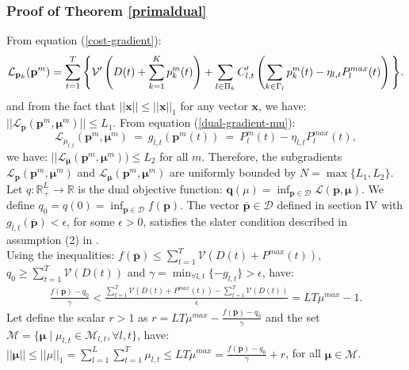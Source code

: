 \documentclass[12pt,draftcls,onecolumn]{IEEEtran}
\begin{document}
\subsubsection{Proof of Theorem \ref{primaldual}}\label{A2}
\indent From equation (\ref{cost-gradient}):
\begin{equation}
\mathcal{L}_{\mathbf{p}_k}(\mathbf{p}^m) = \sum_{t=1}^{T} \Bigg{\{}\mathcal{V}'\left(D(t)+\sum_{k=1}^{K}p^m_k(t)\right) + \sum_{l \in \Pi_k} C'_{l,t}\left(\sum_{k \in \Gamma_l}p^m_k(t)-\eta_{l,t} P_l^{max}(t)\right)\Bigg{\}}. \label{cost-gradient}
\end{equation}
 and from the fact that $||\mathbf{x}|| \leq ||\mathbf{x}||_1$ for any vector $\mathbf{x}$, we have: $||\mathcal{L}_{\mathbf{p}}(\mathbf{p}^{m}, \mathbf{\mu}^{m})|| \leq L_1$. From equation (\ref{dual-gradient-mu}):
\begin{equation}
\mathcal{L}_{\mu_{l,t}}(\mathbf{p}^m, \mathbf{\mu}^m) \ = \ g_{l,t}(\mathbf{p}^m(t)) \ = \ P^m_l(t) - \eta_{l,t}P_l^{max}(t),
\label{dual-gradient-mu}
\end{equation}
we have: $||\mathcal{L}_{\mathbf{\mu}}(\mathbf{p}^{m}, \mathbf{\mu}^{m})) \leq L_2$ for all $m$. Therefore, the subgradients $\mathcal{L}_{\mathbf{p}}(\mathbf{p}^{m}, \mathbf{\mu}^{m})$ and $\mathcal{L}_{\mathbf{\mu}}(\mathbf{p}^{m}, \mathbf{\mu}^{m})$ are uniformly bounded by $N=\max\{L_1, L_2\}$.\\
\indent Let $q: \mathbb{R}_{+}^{L} \rightarrow \mathbb{R}$ is the dual objective function: $\mathbf{q}({\mu})=\inf_{\mathbf{p} \in \mathcal{D}}\mathcal{L}(\mathbf{p}, \mathbf{\mu})$. We define $q_0 = q(0) = \inf_{\mathbf{p} \in \mathcal{D}}f(\mathbf{p})$. The vector $\overline{\mathbf{p}} \in \mathcal{D}$ defined in section IV with $g_{l,t}(\overline{\mathbf{p}}) < \epsilon$, for some $\epsilon > 0$, satisfies the slater condition described in assumption (2) in \cite{NO09}.\\
\indent Using the inequalities: $f(\overline{\mathbf{p}}) \leq \sum_{t=1}^{T}\mathcal{V}(D(t)+P^{max}(t))$, $q_0 \geq \sum_{t=1}^{T}\mathcal{V}(D(t))$ and $\gamma = \min_{\forall l, t}\{-g_{l,t}\} > \epsilon$, have:\\
\begin{gather}
\frac{f(\overline{\mathbf{p}})-q_0}{\gamma}<\frac{\sum_{t=1}^{T}\mathcal{V}(D(t)+P^{max}(t))-\sum_{t=1}^{T}\mathcal{V}(D(t))}{\epsilon}=LT\mu^{max}-1.
\label{mumax-ineq}
\end{gather}
Let define the scalar $r>1$ as $r=LT\mu^{max}-\frac{f(\overline{\mathbf{p}})-q_0}{\gamma}$ and the set $\mathcal{M}=\{ \mathbf{\mu} \mid \mu_{l, t} \in \mathcal{M}_{l,t}, \forall l, t\}$, have: $||\mathbf{\mu}|| \leq ||\mu||_1=\sum_{l=1}^L \sum_{t=1}^{T} \mu_{l,t} \leq LT\mu^{max}=\frac{f(\overline{\mathbf{p}})-q_0}{\gamma}+r$, for all $\mathbf{\mu} \in \mathcal{M}$.\\
\end{document}
